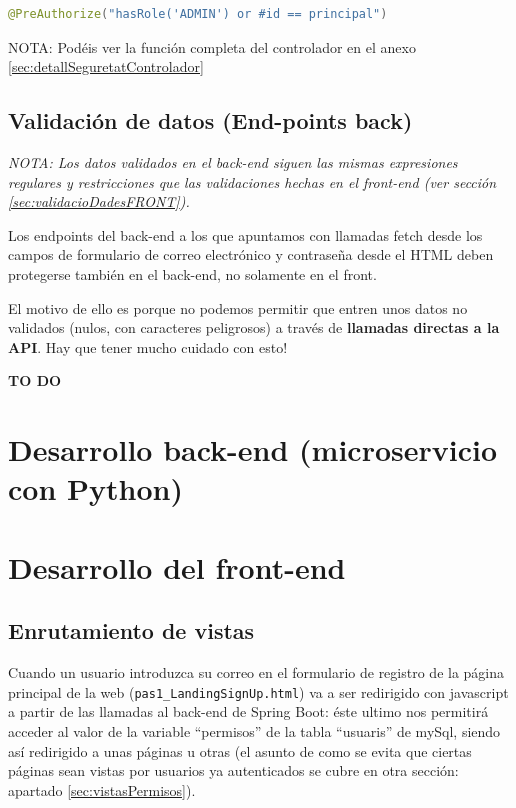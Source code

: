 \documentclass[a4paper,12pt]{report}
\begin{document}
\begin{lstlisting}[language=java, basicstyle=\ttfamily\footnotesize, keywordstyle=\color{magenta}]
	@PreAuthorize("hasRole('ADMIN') or #id == principal")
\end{lstlisting}

	NOTA: Podéis ver la función completa del controlador en el anexo \ref{sec:detallSeguretatControlador}
	
	
		
		

		
		
			\subsection{Validación de datos (End-points back)}
			\label{sec:validacioDadesBACK}
			
			\textit{NOTA: Los datos validados en el back-end siguen las mismas expresiones regulares y restricciones que las validaciones hechas en el front-end (ver sección \ref{sec:validacioDadesFRONT}).}
			
			Los endpoints del back-end a los que apuntamos con llamadas fetch desde los campos de formulario de correo electrónico y contraseña desde el HTML deben protegerse también en el back-end, no solamente en el front.
			
			El motivo de ello es porque no podemos permitir que entren unos datos no validados (nulos, con caracteres peligrosos) a través de \textbf{llamadas directas a la API}. Hay que tener mucho cuidado con esto!
			
		\textbf{	TO DO }
			

		
	\section{Desarrollo back-end (microservicio con Python)}
	
	
	
	
	
	\section{Desarrollo del front-end}
	
	\subsection{Enrutamiento de vistas}
	\label{sec:EnrutamientoDeVistas}
	
	Cuando un usuario introduzca su correo en el formulario de registro de la página principal de la web (\texttt{pas1\_LandingSignUp.html}) va a ser redirigido con javascript a partir de las llamadas al back-end de Spring Boot: éste ultimo nos permitirá acceder al valor de la variable ``permisos'' de la tabla ``usuaris'' de mySql, siendo así redirigido a unas páginas u otras (el asunto de como se evita que ciertas páginas sean vistas por usuarios ya autenticados se cubre en otra sección: apartado \ref{sec:vistasPermisos}).
	
\end{document}
